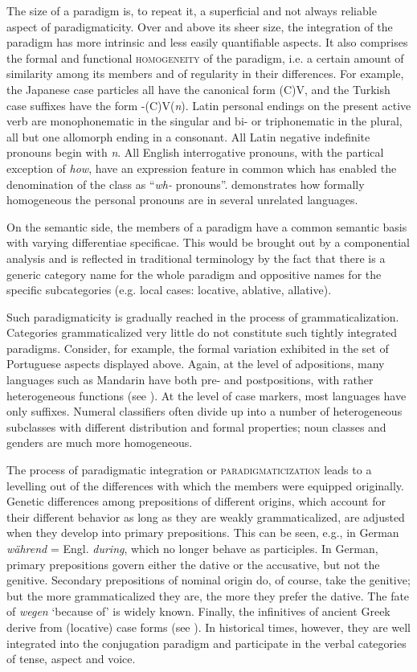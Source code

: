 The size of a paradigm is, to repeat it, a superficial and not always reliable aspect of paradigmaticity. Over and above its sheer size, the integration of the paradigm has more intrinsic and less easily quantifiable aspects. It also comprises the formal and functional \textsc{homogeneity} of the paradigm, i.e. a certain amount of similarity among its members and of regularity in their differences. For example, the Japanese case particles all have the canonical form (C)V, and the Turkish case suffixes have the form -(C)V(\textit{n}). Latin personal endings on the present active verb are monophonematic in the singular and bi- or triphonematic in the plural, all but one allomorph ending in a consonant. All Latin negative indefinite pronouns begin with \textit{n}. All English interrogative pronouns, with the partical exception of \textit{how}, have an expression feature in common which has enabled the denomination of the class as ``\textit{wh-} pronouns''. \citet[256f]{Bloomfield1933} demonstrates how formally homogeneous the personal pronouns are in several unrelated languages.

On the semantic side, the members of a paradigm have a common semantic basis with varying differentiae specificae. This would be brought out by a componential analysis and is reflected in traditional terminology by the fact that there is a generic category name for the whole paradigm and oppositive names for the specific subcategories (e.g. local cases: locative, ablative, allative).

Such paradigmaticity is gradually reached in the process of grammaticalization. Categories grammaticalized very little do not constitute such tightly integrated paradigms. Consider, for example, the formal variation exhibited in the set of Portuguese aspects displayed above. Again, at the level of adpositions, many languages such as Mandarin have both pre- and postpositions, with rather heterogeneous functions (see \citealt{Hagège1975}). At the level of case markers, most languages have only suffixes. Numeral classifiers often divide up into a number of heterogeneous subclasses with different distribution and formal properties; noun classes and genders are much more homogeneous.

The process of paradigmatic integration or \textsc{paradigmaticization} leads to a levelling out of the differences with which the members were equipped originally. Genetic differences among prepositions of different origins, which account for their different behavior as long as they are weakly grammaticalized, are adjusted when they develop into primary prepositions. This can be seen, e.g., in German \textit{während} = Engl. \textit{during}, which no longer behave as participles. In German, primary prepositions govern either the dative or the accusative, but not the genitive. Secondary prepositions of nominal origin do, of course, take the genitive; but the more grammaticalized they are, the more they prefer the dative. The fate of \textit{wegen} ‘because of’ is widely known. Finally, the infinitives of ancient Greek derive from (locative) case forms (see \citealt[196f, 237--239]{Rix1976}). In historical times, however, they are well integrated into the conjugation paradigm and participate in the verbal categories of tense, aspect and voice.

